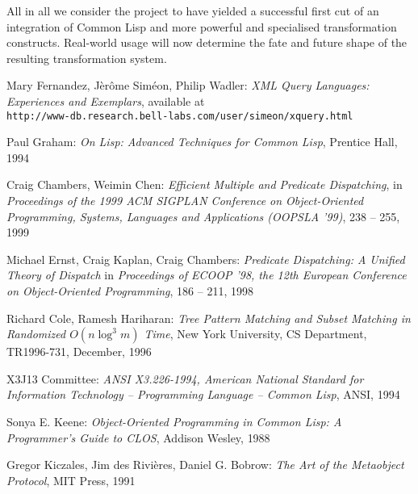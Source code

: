 \documentclass[a4paper,11pt]{scrartcl}
\begin{document}
All in all we consider the project to have yielded a successful first
cut of an integration of Common Lisp and more powerful and specialised
transformation constructs.  Real-world usage will now determine the
fate and future shape of the resulting transformation system.

\begin{thebibliography}{99}
  Mary Fernandez, J\`er\^ome Sim\'eon, Philip Wadler:
  \textsl{XML Query Languages: Experiences and Exemplars}, 
  available at\\ 
  {\tt http://www-db.research.bell-labs.com/user/simeon/xquery.html}

  Paul Graham:
  \textsl{On Lisp: Advanced Techniques for Common Lisp},
  Prentice Hall, 1994

  Craig Chambers, Weimin Chen:
  \textsl{Efficient Multiple and Predicate Dispatching},
  in \textsl{Proceedings of the 1999 ACM SIGPLAN Conference on
    Object-Oriented Programming, Systems, Languages and Applications
    (OOPSLA '99)}, 238 -- 255, 1999

  Michael Ernst, Craig Kaplan, Craig Chambers:
  \textsl{Predicate Dispatching: A Unified Theory of Dispatch}
  in \textsl{Proceedings of ECOOP '98, the 12th European Conference on
    Object-Oriented Programming}, 186 -- 211, 1998

  Richard Cole, Ramesh Hariharan:
  \textsl{Tree Pattern Matching and Subset Matching in
    Randomized $O(n \log^3 m)$ Time},
  New York University, CS Department, TR1996-731,
  December, 1996

  X3J13 Committee:
  \textsl{ANSI X3.226-1994, American National Standard for Information
    Technology -- Programming Language -- Common Lisp}, ANSI, 1994
  
  Sonya E. Keene:
  \textsl{Object-Oriented Programming in Common Lisp:
    A Programmer's Guide to CLOS},
  Addison Wesley, 1988

  Gregor Kiczales, Jim des Rivi\`eres, Daniel G. Bobrow:
  \textsl{The Art of the Metaobject Protocol},
  MIT Press, 1991

\end{thebibliography}
\end{document}
